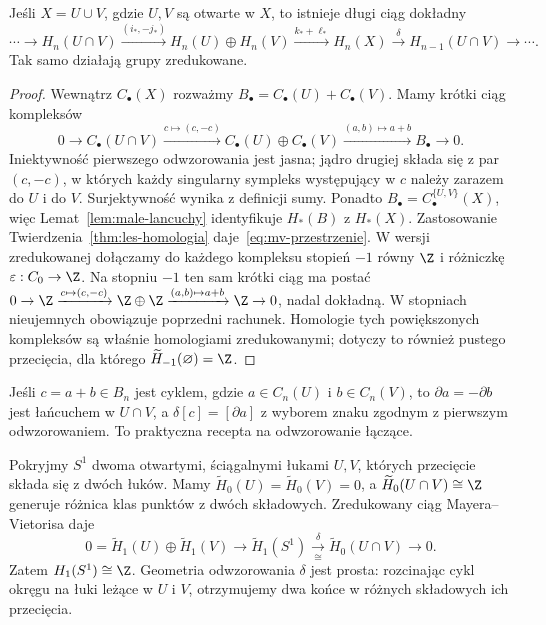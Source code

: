 \begin{twierdzenie}
\label{thm:mv-przestrzenie}
Jeśli $X=U\cup V$, gdzie $U,V$
są otwarte w $X$, to istnieje
długi ciąg dokładny
\begin{equation}\label{eq:mv-przestrzenie}
 \cdots\to H_n(U\cap V)
 \xrightarrow{(i_*,-j_*)}
 H_n(U)\oplus H_n(V)
 \xrightarrow{k_*+\ell_*}H_n(X)
 \xrightarrow{\delta}H_{n-1}(U\cap V)\to\cdots.
\end{equation}
Tak samo działają grupy zredukowane.
\end{twierdzenie}
\begin{proof}
Wewnątrz $C_\bullet(X)$ rozważmy
$B_\bullet=C_\bullet(U)+C_\bullet(V)$.
Mamy krótki ciąg kompleksów
\[
 0\to C_\bullet(U\cap V)
 \xrightarrow{c\mapsto(c,-c)}
 C_\bullet(U)\oplus C_\bullet(V)
 \xrightarrow{(a,b)\mapsto a+b}
 B_\bullet\to0.
\]
Iniektywność pierwszego odwzorowania jest jasna;
jądro drugiej składa się z par
$(c,-c)$, w których każdy singularny
sympleks występujący w $c$ należy
zarazem do $U$ i do $V$.
Surjektywność wynika z definicji sumy.
Ponadto $B_\bullet=C_\bullet^{\{U,V\}}(X)$,
więc Lemat~\ref{lem:male-lancuchy}
identyfikuje $H_*(B)$ z $H_*(X)$.
Zastosowanie Twierdzenia~\ref{thm:les-homologia}
daje~\eqref{eq:mv-przestrzenie}.
W wersji zredukowanej dołączamy
do każdego kompleksu stopień $-1$
równy $\Z$ i różniczkę
$\varepsilon:C_0\to\Z$.
Na stopniu $-1$ ten sam krótki
ciąg ma postać
$0\to\Z\xrightarrow{c\mapsto(c,-c)}
\Z\oplus\Z\xrightarrow{(a,b)\mapsto a+b}
\Z\to0$, nadal dokładną.
W stopniach nieujemnych
obowiązuje poprzedni rachunek.
Homologie tych powiększonych
kompleksów są właśnie
homologiami zredukowanymi;
dotyczy to również pustego
przecięcia, dla którego
$\widetilde H_{-1}(\varnothing)=\Z$.
\end{proof}

Jeśli $c=a+b\in B_n$ jest cyklem,
gdzie $a\in C_n(U)$ i $b\in C_n(V)$,
to $\partial a=-\partial b$ jest
łańcuchem w $U\cap V$, a
$\delta[c]=[\partial a]$ z wyborem
znaku zgodnym z pierwszym odwzorowaniem.
To praktyczna recepta na odwzorowanie łączące.

\begin{przyklad}
\label{prz:mv-okrag}
Pokryjmy $S^1$ dwoma otwartymi,
ściągalnymi łukami $U,V$, których
przecięcie składa się z dwóch
łuków. Mamy
$\widetilde H_0(U)=
\widetilde H_0(V)=0$,
a $\widetilde H_0(U\cap V)\cong\Z$
generuje różnica klas punktów
z dwóch składowych.
Zredukowany ciąg
Mayera--Vietorisa daje
\[
 0=\widetilde H_1(U)\oplus
 \widetilde H_1(V)\to
 \widetilde H_1(S^1)
 \xrightarrow[\cong]{\delta}
 \widetilde H_0(U\cap V)\to0.
\]
Zatem $H_1(S^1)\cong\Z$.
Geometria odwzorowania $\delta$ jest prosta:
rozcinając cykl okręgu na łuki
leżące w $U$ i $V$, otrzymujemy
dwa końce w różnych składowych
ich przecięcia.
\end{przyklad}

